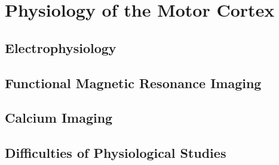 \section{Physiology of the Motor Cortex}

\subsection{Electrophysiology}

\subsection{Functional Magnetic Resonance Imaging}

\subsection{Calcium Imaging}

\subsection{Difficulties of Physiological Studies}
